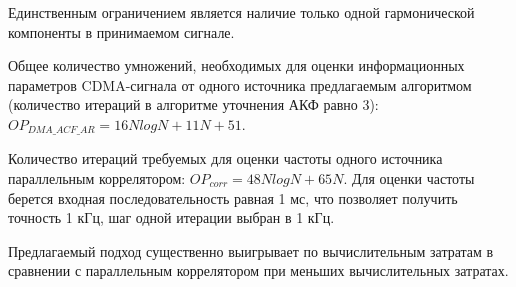 Единственным ограничением является наличие только одной гармонической компоненты в принимаемом сигнале.

Общее количество умножений, необходимых для оценки информационных параметров CDMA-сигнала от одного источника предлагаемым
алгоритмом (количество итераций в алгоритме уточнения АКФ равно 3): ${OP_{DMA\_ACF\_AR} = 16NlogN + 11N + 51}$.

Количество итераций требуемых для оценки частоты одного источника параллельным коррелятором:
${OP_{corr} = 48NlogN + 65N}$. Для оценки частоты берется входная последовательность равная 1 мс, что позволяет
получить точность 1 кГц, шаг одной итерации выбран в 1 кГц.

Предлагаемый подход существенно выигрывает по вычислительным затратам в сравнении с параллельным коррелятором при
меньших вычислительных затратах.
